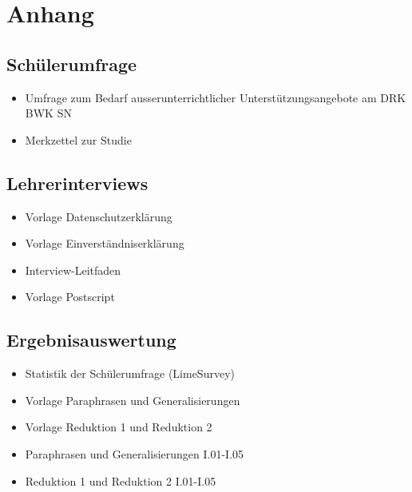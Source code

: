 \listoffigures

\newpage

\section{Anhang}
\label{sec:Anhang}

\subsection{Schülerumfrage}
\label{sec:Schülerumfrage}

\begin{itemize}
	\item Umfrage zum Bedarf ausserunterrichtlicher Unterstützungsangebote am DRK BWK SN 
	\item Merkzettel zur Studie 
\end{itemize}




\subsection{Lehrerinterviews}
\label{sec:Lehrerinterviews}

\begin{itemize}
	\item Vorlage Datenschutzerklärung
	\item Vorlage Einverständniserklärung 
	\item Interview-Leitfaden 
	\item Vorlage Postscript
\end{itemize}






\subsection{Ergebnisauswertung}
\label{sec:Ergebnisauswertung}

	\begin{itemize}
	\item Statistik der Schülerumfrage (LimeSurvey)
	\item Vorlage Paraphrasen und Generalisierungen
	\item Vorlage Reduktion 1 und Reduktion 2
	\item Paraphrasen und Generalisierungen I.01-I.05
	\item Reduktion 1 und Reduktion 2 I.01-I.05
	\end{itemize}
	
